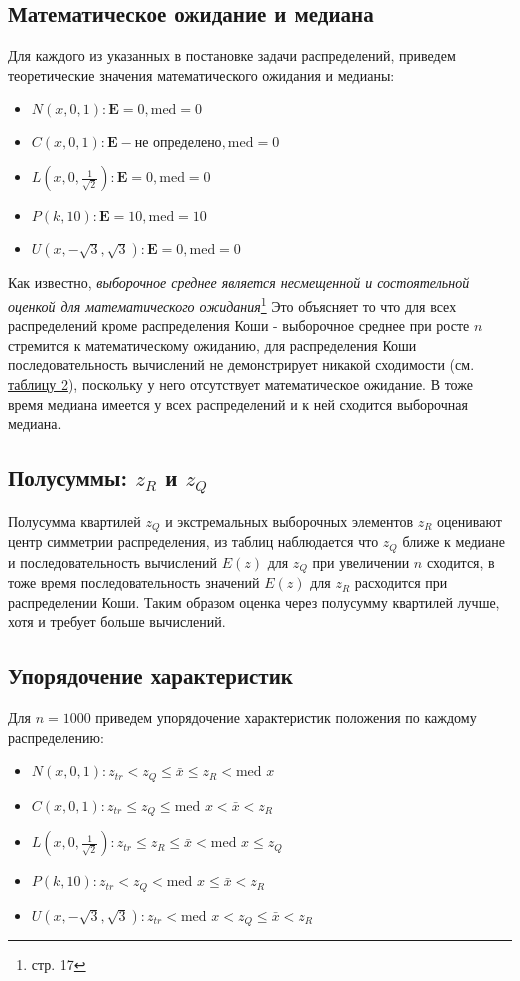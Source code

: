 \documentclass[12pt,a4paper]{article}
\begin{document}
	\subsection{Математическое ожидание и медиана}
	Для каждого из указанных в постановке задачи распределений, приведем теоретические значения математического ожидания и медианы:
	
	\begin{itemize}
		\item $N(x, 0, 1): \mathbf{E}=0, \text{med}=0$ 
		\item $C(x, 0, 1): \mathbf{E} - \text{не определено}, \text{med}=0$
		\item $L(x, 0, \frac{1}{\sqrt{2}}): \mathbf{E}=0, \text{med}=0$
		\item $P(k, 10): \mathbf{E}=10, \text{med}=10$
		\item $U(x, -\sqrt{3}, \sqrt{3}): \mathbf{E}=0, \text{med}=0$
	\end{itemize}
	
	Как известно, \textit{выборочное среднее является несмещенной и состоятельной оценкой для математического ожидания}\footnote{\cite{chernova} стр. 17} Это объясняет то что для всех распределений кроме распределения Коши - выборочное среднее при росте $n$ стремится к математическому ожиданию, для распределения Коши последовательность вычислений не демонстрирует никакой сходимости (см. \hyperref[tab:cauchy]{таблицу 2}), поскольку у него отсутствует математическое ожидание. В тоже время медиана имеется у всех распределений и к ней сходится выборочная медиана.
	
	\subsection{Полусуммы: $z_R$ и $z_Q$}
	Полусумма квартилей $z_Q$ и экстремальных выборочных элементов $z_R$ оценивают центр симметрии распределения, из таблиц наблюдается что $z_Q$ ближе к медиане и последовательность вычислений $E(z) \text{ для } z_Q$ при увеличении $n$ сходится, в тоже время последовательность значений $E(z) \text{ для } z_R$ расходится при распределении Коши. Таким образом оценка через полусумму квартилей лучше, хотя и требует больше вычислений.
	
	\subsection{Упорядочение характеристик}
	Для $n=1000$ приведем упорядочение характеристик положения по каждому распределению:
	\begin{itemize}
		\item $N(x, 0, 1): z_{tr} < z_Q \leq \bar x \leq z_R < \text{med }x$
		\item $C(x, 0, 1): z_{tr} \leq z_Q \leq \text{med }x < \bar x < z_R$
		\item $L(x, 0, \frac{1}{\sqrt{2}}): z_{tr} \leq z_R \leq \bar x < \text{med }x \leq z_Q$
		\item $P(k, 10): z_{tr} < z_Q < \text{med }x \leq \bar x < z_R$
		\item $U(x, -\sqrt{3}, \sqrt{3}): z_{tr} < \text{med }x < z_Q \leq \bar x < z_R$
	\end{itemize}
\pagebreak
\end{document}

